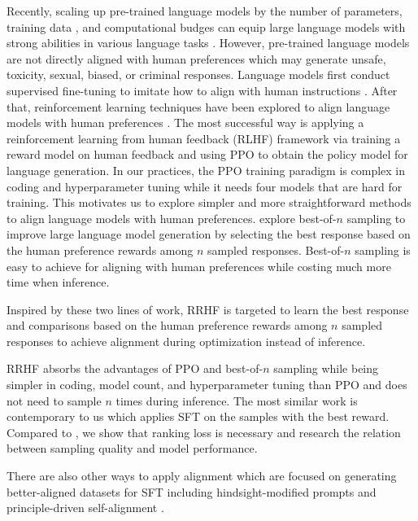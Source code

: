 Recently, scaling up pre-trained language models by the number of parameters, training data \cite{scaling_law}, and computational budges \cite{hoffmann2022training} can equip large language models with strong abilities in various language tasks \cite{gpt3,gopher,chowdhery2022palm,stepbystep,gpt4,yuan2023large}. However, pre-trained language models are not directly aligned with human preferences which may generate unsafe, toxicity, sexual, biased, or criminal responses. Language models first conduct supervised fine-tuning to imitate how to align with human instructions \cite{selfinstruct,alpaca}. After that, reinforcement learning techniques have been explored to align language models with human preferences \cite{bahdanau2018learning,bohm-etal-2019-better,stiennon2020learning,rlhfdialog,wu2021recursively,instructgpt,rl4lms}. The most successful way is applying a reinforcement learning from human feedback (RLHF) framework \cite{ziegler2019fine,stiennon2020learning,instructgpt} via training a reward model on human feedback and using PPO \cite{schulman2017proximal} to obtain the policy model for language generation. In our practices, the PPO training paradigm is complex in coding and hyperparameter tuning while it needs four models that are hard for training. This motivates us to explore simpler and more straightforward methods to align language models with human preferences. 
\citet{nakano2021webgpt,Askell2021AGL,cobbe2021gsm8k} explore best-of-$n$ sampling to improve large language model generation by selecting the best response based on the human preference rewards among $n$ sampled responses. Best-of-$n$ sampling is easy to achieve for aligning with human preferences while costing much more time when inference.

Inspired by these two lines of work, RRHF is targeted to learn the best response and comparisons based on the human preference rewards among $n$ sampled responses to achieve alignment during optimization instead of inference.

RRHF absorbs the advantages of PPO and best-of-$n$ sampling while being simpler in coding, model count, and hyperparameter tuning than PPO and does not need to sample $n$ times during inference. The most similar work \cite{raft} is contemporary to us which applies SFT on the samples with the best reward. Compared to \citet{raft}, we show that ranking loss is necessary and research the relation between sampling quality and model performance.

There are also other ways to apply alignment which are focused on generating better-aligned datasets for SFT including hindsight-modified prompts \cite{zhang2023wisdom,liu2023languages} and principle-driven self-alignment \cite{sun2023principle}.

